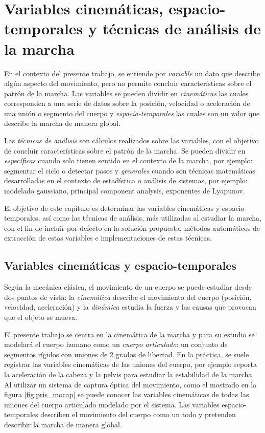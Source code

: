 \chapter[Variables y técnicas]{Variables cinemáticas, espacio-temporales y técnicas de análisis de la marcha}
\label{variables-tecnicas}

En el contexto del presente trabajo, se entiende por \emph{variable} un dato que describe algún aspecto del movimiento, pero no permite concluir características sobre el patrón de la marcha. Las variables se pueden dividir en \emph{cinemáticas} las cuales corresponden a una serie de datos sobre la posición, velocidad o aceleración de una unión o segmento del cuerpo y \emph{espacio-temporales} las cuales son un valor que describe la marcha de manera global. 

Las \emph{técnicas de análisis} son cálculos realizados sobre las variables, con el objetivo de concluir características sobre el patrón de la marcha. Se pueden dividir en \emph{específicas} cuando solo tienen sentido en el contexto de la marcha, por ejemplo: segmentar el ciclo o detectar pasos y \emph{generales} cuando son técnicas matemáticas desarrolladas en el contexto de estadística o análisis de sistemas, por ejemplo: modelado gaussiano, principal component analysis, exponentes de Lyapunov.


El objetivo de este capítulo es determinar las variables cinemáticas y espacio-temporales, así como las técnicas de análisis, más utilizadas al estudiar la marcha, con el fin de incluir por defecto en la solución propuesta, métodos automáticos de extracción de estas variables e implementaciones de estas técnicas. 

\section[Variables]{Variables cinemáticas y espacio-temporales}

Según la mecánica clásica, el movimiento de un cuerpo se puede estudiar desde dos puntos de vista: la \emph{cinemática} describe el movimiento del cuerpo (posición, velocidad, aceleración) y la \emph{dinámica} estudia la fuerza y las causas que provocan que el objeto se mueva. \citep{giancoli} 

El presente trabajo se centra en la cinemática de la marcha y para su estudio se modelará el cuerpo humano como un \emph{cuerpo articulado}: un conjunto de segmentos rígidos con uniones de 2 grados de libertad. En la práctica, se suele registrar las variables cinemáticas de las uniones del cuerpo, por ejemplo \cite{menz} reporta la aceleración de la cabeza y la pelvis para estudiar la estabilidad de la marcha. Al utilizar un sistema de captura óptica del movimiento, como el mostrado en la figura \ref{fig:pris_mocap} se puede conocer las variables cinemáticas de todas las uniones del cuerpo articulado modelado por el sistema. Las variables espacio-temporales describen el movimiento del cuerpo como un todo y pretenden describir la marcha de manera global. 

